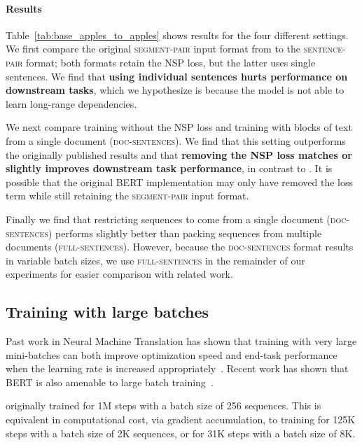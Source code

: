 \paragraph{Results}

Table~\ref{tab:base_apples_to_apples} shows results for the four different settings.
We first compare the original \textsc{segment-pair} input format from  to the \textsc{sentence-pair} format; both formats retain the NSP loss, but the latter uses single sentences.
We find that \textbf{using individual sentences hurts performance on downstream tasks}, which we hypothesize is because the model is not able to learn long-range dependencies.

We next compare training without the NSP loss and training with blocks of text from a single document (\textsc{doc-sentences}).
We find that this setting outperforms the originally published \bertbase{} results and that \textbf{removing the NSP loss matches or slightly improves downstream task performance}, in contrast to .
It is possible that the original BERT implementation may only have removed the loss term while still retaining the \textsc{segment-pair} input format.

Finally we find that restricting sequences to come from a single document (\textsc{doc-sentences}) performs slightly better than packing sequences from multiple documents (\textsc{full-sentences}).
However, because the \textsc{doc-sentences} format results in variable batch sizes, we use \textsc{full-sentences} in the remainder of our experiments for easier comparison with related work.


\subsection{Training with large batches}
\label{sec:large_batches}

Past work in Neural Machine Translation has shown that training with very large mini-batches can both improve optimization speed and end-task performance when the learning rate is increased appropriately~\cite{ott2018scaling}.
Recent work has shown that BERT is also amenable to large batch training~\cite{you2019reducing}.

 originally trained \bertbase{} for 1M steps with a batch size of 256 sequences.
This is equivalent in computational cost, via gradient accumulation, to training for 125K steps with a batch size of 2K sequences, or for 31K steps with a batch size of 8K.

